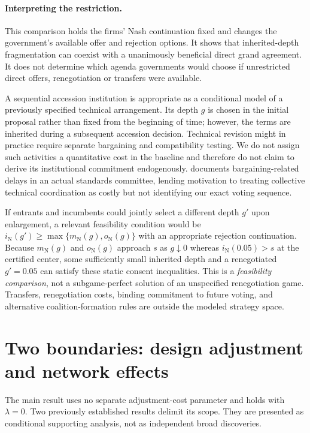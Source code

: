 \documentclass[11pt,a4paper]{article}
\theoremstyle{remark}\newtheorem{remark}[theorem]{Remark}
\newcommand{\N}{\mathrm{N}}\newcommand{\F}{\mathrm{F}}
\begin{document}
\paragraph{Interpreting the restriction.}
This comparison holds the firms' Nash continuation fixed and changes the government's available offer and rejection options. It shows that inherited-depth fragmentation can coexist with a unanimously beneficial direct grand agreement. It does not determine which agenda governments would choose if unrestricted direct offers, renegotiation or transfers were available.

A sequential accession institution is appropriate as a conditional model of a previously specified technical arrangement. Its depth $g$ is chosen in the initial proposal rather than fixed from the beginning of time; however, the terms are inherited during a subsequent accession decision. Technical revision might in practice require separate bargaining and compatibility testing. We do not assign such activities a quantitative cost in the baseline and therefore do not claim to derive its institutional commitment endogenously. \citet{Simcoe2012} documents bargaining-related delays in an actual standards committee, lending motivation to treating collective technical coordination as costly but not identifying our exact voting sequence.

If entrants and incumbents could jointly select a different depth $g'$ upon enlargement, a relevant feasibility condition would be $i_{\N}(g')\ge\max\{m_{\N}(g),o_{\N}(g)\}$ with an appropriate rejection continuation. Because $m_{\N}(g)$ and $o_{\N}(g)$ approach $s$ as $g\downarrow0$ whereas $i_{\N}(0.05)>s$ at the certified center, some sufficiently small inherited depth and a renegotiated $g'=0.05$ can satisfy these static consent inequalities. This is a \emph{feasibility comparison}, not a subgame-perfect solution of an unspecified renegotiation game. Transfers, renegotiation costs, binding commitment to future voting, and alternative coalition-formation rules are outside the modeled strategy space.

\section{Two boundaries: design adjustment and network effects}\label{sec:boundaries}
The main result uses no separate adjustment-cost parameter and holds with $\lambda=0$. Two previously established results delimit its scope. They are presented as conditional supporting analysis, not as independent broad discoveries.
\end{document}
